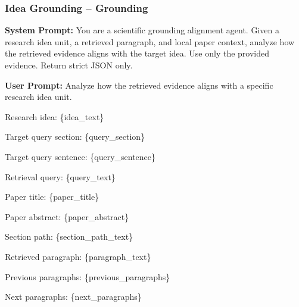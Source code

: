 \subsubsection{Idea Grounding -- Grounding}
\label{prompt:task1-refinement}

\begin{tcolorbox}[breakable, colback=green!5!white, colframe=green!60!black,
  left=1ex, right=1ex, top=0.5ex, bottom=0.5ex,
  fontupper=\small\ttfamily, fontlower=\small\ttfamily,
  title=\textbf{Idea Grounding -- Grounding:} Analyze how retrieved evidence aligns with a research idea unit.]
\textbf{System Prompt:}
You are a scientific grounding alignment agent.
Given a research idea unit, a retrieved paragraph, and local paper context, analyze how the retrieved evidence aligns with the target idea.
Use only the provided evidence. Return strict JSON only.

\medskip\textbf{User Prompt:}
Analyze how the retrieved evidence aligns with a specific research idea unit.

Research idea:
\{idea\_text\}

Target query section:
\{query\_section\}

Target query sentence:
\{query\_sentence\}

Retrieval query:
\{query\_text\}

Paper title:
\{paper\_title\}

Paper abstract:
\{paper\_abstract\}

Section path:
\{section\_path\_text\}

Retrieved paragraph:
\{paragraph\_text\}

Previous paragraphs:
\{previous\_paragraphs\}

Next paragraphs:
\{next\_paragraphs\}


\end{tcolorbox}
